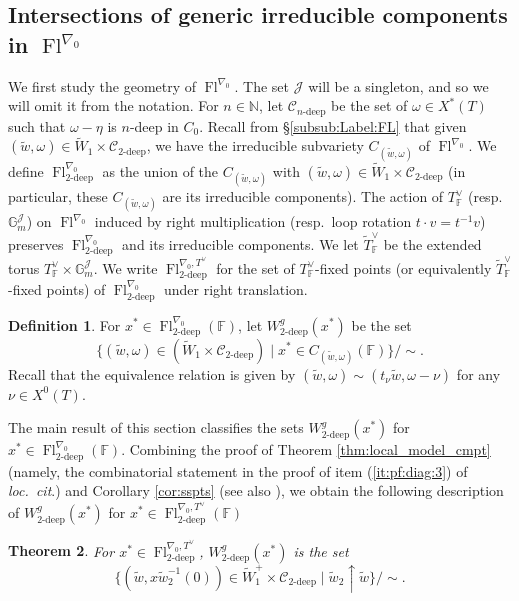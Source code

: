 \documentclass[oneside,a4paper,english, 11pt]{amsart}
\theoremstyle{plain}
\newtheorem{thm}{Theorem}[subsection]
\theoremstyle{plain}
\theoremstyle{plain}
\theoremstyle{plain}
\theoremstyle{plain}
\theoremstyle{plain}
\theoremstyle{definition}
\newtheorem{defn}[thm]{Definition}
\theoremstyle{definition}
\theoremstyle{definition}
\theoremstyle{remark}
\numberwithin{equation}{section}
\newcommand{\bG}{\mathbb{G}}
\newcommand{\F}{\mathbb{F}}
\newcommand{\N}{\mathbb{N}}
\newcommand{\cC}{\mathcal{C}}
\newcommand{\cJ}{\mathcal{J}}
\newcommand{\tld}[1]{\widetilde{#1}}
\DeclareMathOperator{\Fl}{Fl}
\begin{document}
\subsection{Intersections of generic irreducible components in $\Fl^{\nabla_0}$}
\label{subsec:geometricFL}

We first study the geometry of $\Fl^{\nabla_0}$. 
The set $\cJ$ will be a singleton, and so we will omit it from the notation. 
For $n\in \N$, let $\cC_{n\text{-deep}}$ be the set of $\omega\in X^*(T)$ such that $\omega-\eta$ is $n$-deep in $C_0$.
%
Recall from \S \ref{subsub:Label:FL} that given $(\tld{w},\omega) \in \tld{W}_1 \times \cC_{2\text{-deep}}$, we have the irreducible subvariety $C_{(\tld{w},\omega)}$ of $\Fl^{\nabla_0}$.
%
We define $\Fl_{2\textrm{-deep}}^{\nabla_0}$ as the union of the $C_{(\tld{w},\omega)}$ with $(\tld{w},\omega)\in \tld{W}_1 \times \cC_{2\text{-deep}}$ (in particular, these $C_{(\tld{w},\omega)}$ are its irreducible components). 
The action of $T_{\F}^\vee$ (resp.~$\bG_m^{\cJ}$) on $\Fl^{\nabla_0}$ induced by right multiplication (resp.~loop rotation $t\cdot v = t^{-1}v$) preserves $\Fl_{2\textrm{-deep}}^{\nabla_0}$ and its irreducible components. 
We let $\tld{T}_{\F}^\vee$ be the extended torus $T_{\F}^\vee \times\bG_m^{\cJ}$. 
We write $\Fl_{2\textrm{-deep}}^{\nabla_0,T^\vee}$ for the set of $T_{\F}^\vee$-fixed points (or equivalently $\tld{T}_{\F}^\vee$-fixed points) of $\Fl_{2\textrm{-deep}}^{\nabla_0}$ under right translation. 


\begin{defn}
For $x^* \in \Fl_{2\textrm{-deep}}^{\nabla_0}(\F)$, let $W_{2\textrm{-deep}}^g(x^*)$ be the set 
%
\[
\{(\tld{w},\omega) \in (\tld{W}_1 \times \cC_{2\text{-deep}}) \mid x^* \in C_{(\tld{w},\omega)}(\F)\}/\sim.
\] 
Recall that the equivalence relation is given by $(\tld{w}, \omega) \sim (t_{\nu} \tld{w}, \omega - \nu)$ for any $\nu \in X^0(T)$.    
%
\end{defn}

The main result of this section classifies the sets $W^g_{2\textrm{-deep}}(x^*)$ for $x^*\in \Fl_{2\textrm{-deep}}^{\nabla_0}(\F)$. 
Combining the proof of Theorem \ref{thm:local_model_cmpt} (namely, the combinatorial statement in the proof of item (\ref{it:pf:diag:3}) of \emph{loc.~cit}.) and Corollary \ref{cor:sspts} (see also \cite[Prop.~2.6.2]{MLM}), we obtain the following description of $W^g_{2\textrm{-deep}}(x^*)$ for $x^* \in \Fl_{2\textrm{-deep}}^{\nabla_0,T^\vee}(\F)$

\begin{thm}\label{thm:Tfixed}
%
For $x^* \in \Fl_{2\textrm{-deep}}^{\nabla_0,T^\vee}$, $W^g_{2\textrm{-deep}}(x^*)$ is the set
\[
\{(\tld{w},x\tld{w}_2^{-1}(0)) \in \tld{W}_1^+ \times \cC_{2\text{-deep}} \mid \tld{w}_2 \uparrow \tld{w}\}/\sim.
\]
%
%
%
%
%
%
\end{thm}
\end{document}
